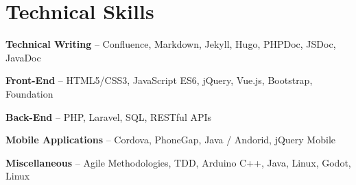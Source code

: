 \section{Technical Skills}
\begin{small}
	\parbox[t][][t]{\linewidth}{
		\textbf{Technical Writing} -- Confluence, Markdown, Jekyll, Hugo, PHPDoc, JSDoc, JavaDoc
		\smallbreak
	}
	\parbox[t][][t]{\linewidth}{
	\textbf{Front-End} -- HTML5/CSS3, JavaScript ES6, jQuery, Vue.js, Bootstrap, Foundation
	\smallbreak
}
	\parbox[t][][t]{\linewidth}{
		\textbf{Back-End} -- PHP, Laravel, SQL, RESTful APIs
		\smallbreak
	}
	\parbox[t][][t]{\linewidth}{
		\textbf{Mobile Applications} -- Cordova, PhoneGap, Java / Andorid, jQuery Mobile
		\smallbreak
	}
	\parbox[t][][t]{\linewidth}{
	\textbf{Miscellaneous} -- Agile Methodologies, TDD, Arduino C++, Java, Linux, Godot, Linux
}
\end{small}
